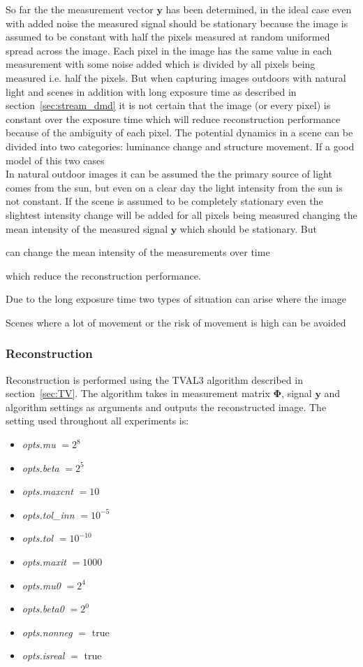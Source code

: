 So far the the measurement vector $\mathbf{y}$ has been determined, in the ideal case even with added noise the measured signal should be stationary because the image is assumed to be constant with half the pixels measured at random uniformed spread across the image. Each pixel in the image has the same value in each measurement with some noise added which is divided by all pixels being measured	 i.e. half the pixels. But when capturing images outdoors with natural light and scenes in addition with long exposure time as described in section~\ref{sec:stream_dmd} it is not certain that the image (or every pixel) is constant over the exposure time which will reduce reconstruction performance because of the ambiguity of each pixel. The potential dynamics in a scene can be divided into two categories: luminance change and structure movement. If a good model of this two cases \\[0.1in] 


In natural outdoor images it can be assumed the the primary source of light comes from the sun, but even on a clear day the light intensity from the sun is not constant. If the scene is assumed to be completely stationary even the slightest intensity change will be added for all pixels being measured changing the mean intensity of the measured signal $\mathbf{y}$ which should be stationary. But 

  

 can change the mean intensity of the measurements over time 

which reduce the reconstruction performance.  	    


Due to the long exposure time two types of situation can arise where the image  	 

Scenes where a lot of movement or the risk of movement is high can be avoided  


\subsubsection{Reconstruction}
Reconstruction is performed using the TVAL3 algorithm described in section~\ref{sec:TV}. The algorithm takes in measurement matrix $\mathbf{\Phi}$, signal $\mathbf{y}$ and algorithm settings as arguments and outputs the reconstructed image. The setting used throughout all experiments is:

\begin{itemize}
\item \textit{opts.mu} $= 2^8$
\item \textit{opts.beta} $= 2^5$
\item \textit{opts.maxcnt} $= 10$
\item \textit{opts.tol\_inn} $= 10^{-5}$
\item \textit{opts.tol} $= 10^{-10}$ 
\item \textit{opts.maxit} $= 1000$
\item \textit{opts.mu0} $= 2^4$ 
\item \textit{opts.beta0} $= 2^0$
\item \textit{opts.nonneg} $=$ true 
\item \textit{opts.isreal} $=$ true	
\end{itemize} 

